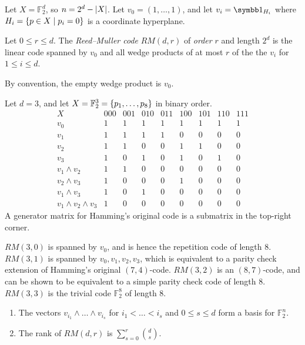 Let \( X = \mathbb F_2^d \), so \( n = 2^d - \abs{X} \).
Let \( v_0 = (1, \dots, 1) \), and let \( v_i = \symbb 1_{H_i} \) where \( H_i = \qty{p \in X \mid p_i = 0} \) is a coordinate hyperplane.
\begin{definition}
    Let \( 0 \leq r \leq d \).
    The \emph{Reed--Muller code} \( RM(d,r) \) of \emph{order} \( r \) and length \( 2^d \) is the linear code spanned by \( v_0 \) and all wedge products of at most \( r \) of the the \( v_i \) for \( 1 \leq i \leq d \).
\end{definition}
By convention, the empty wedge product is \( v_0 \).
\begin{example}
    Let \( d = 3 \), and let \( X = \mathbb F_2^3 = \qty{p_1, \dots, p_8} \) in binary order.
    \[ \begin{array}{c|cccccccc}
        X & 000 & 001 & 010 & 011 & 100 & 101 & 110 & 111 \\\hline
        v_0 & 1 & 1 & 1 & 1 & 1 & 1 & 1 & 1 \\
        v_1 & 1 & 1 & 1 & 1 & 0 & 0 & 0 & 0 \\
        v_2 & 1 & 1 & 0 & 0 & 1 & 1 & 0 & 0 \\
        v_3 & 1 & 0 & 1 & 0 & 1 & 0 & 1 & 0 \\
        v_1 \wedge v_2 & 1 & 1 & 0 & 0 & 0 & 0 & 0 & 0 \\
        v_2 \wedge v_3 & 1 & 0 & 0 & 0 & 1 & 0 & 0 & 0 \\
        v_1 \wedge v_3 & 1 & 0 & 1 & 0 & 0 & 0 & 0 & 0 \\
        v_1 \wedge v_2 \wedge v_3 & 1 & 0 & 0 & 0 & 0 & 0 & 0 & 0
    \end{array} \]
    A generator matrix for Hamming's original code is a submatrix in the top-right corner.
\end{example}
\( RM(3,0) \) is spanned by \( v_0 \), and is hence the repetition code of length 8.
\( RM(3,1) \) is spanned by \( v_0, v_1, v_2, v_3 \), which is equivalent to a parity check extension of Hamming's original \( (7,4) \)-code.
\( RM(3,2) \) is an \( (8,7) \)-code, and can be shown to be equivalent to a simple parity check code of length 8.
\( RM(3,3) \) is the trivial code \( \mathbb F_2^8 \) of length 8.
\begin{theorem}
    \begin{enumerate}
        \item The vectors \( v_{i_1} \wedge \dots \wedge v_{i_s} \) for \( i_1 < \dots < i_s \) and \( 0 \leq s \leq d \) form a basis for \( \mathbb F_2^n \).
        \item The rank of \( RM(d,r) \) is \( \sum_{s=0}^r \binom{d}{s} \).
    \end{enumerate}
\end{theorem}
